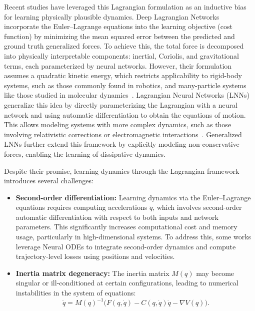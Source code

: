 \documentclass{article}
\theoremstyle{plain}
\theoremstyle{definition}
\theoremstyle{remark}
\begin{document}
Recent studies have leveraged this Lagrangian formulation as an inductive bias for learning physically plausible dynamics.  Deep Lagrangian Networks \cite{deepleangragiaannetworks} incorporate the Euler--Lagrange equations into the learning objective (cost function) by minimizing the mean squared error between the predicted and ground truth generalized forces. To achieve this, the total force is decomposed into physically interpretable components: inertial, Coriolis, and gravitational terms, each parameterized by neural networks. However, their formulation assumes a quadratic kinetic energy, which restricts applicability to rigid-body systems, such as those commonly found in robotics, and many-particle systems like those studied in molecular dynamics~\cite{robotics_systems, molecular_dynamics}. Lagrangian Neural Networks (LNNs) \cite{lnns} generalize this idea by directly parameterizing the Lagrangian with a neural network and using automatic differentiation to obtain the equations of motion. This allows modeling systems with more complex dynamics, such as those involving relativistic corrections or electromagnetic interactions~\cite{lnns}. Generalized LNNs \cite{xiao2024generalizedlagrangianneuralnetworks} further extend this framework by explicitly modeling non-conservative forces, enabling the learning of dissipative dynamics.

Despite their promise, learning dynamics through the Lagrangian framework introduces several challenges:
\begin{itemize}
    \item \textbf{Second-order differentiation:} Learning dynamics via the Euler--Lagrange equations requires computing accelerations $\ddot{q}$, which involves second-order automatic differentiation with respect to both inputs and network parameters. This significantly increases computational cost and memory usage, particularly in high-dimensional systems. To address this, some works leverage Neural ODEs \cite{chen2019neuralordinarydifferentialequations, zhong2024symplecticodenetlearninghamiltonian} to integrate second-order dynamics and compute trajectory-level losses using positions and velocities.
    \item \textbf{Inertia matrix degeneracy:} The inertia matrix $M(q)$ may become singular or ill-conditioned at certain configurations, leading to numerical instabilities in the system of equations:
\[
\ddot{q} = M(q)^{-1} \bigl( F(q, \dot{q}) - C(q, \dot{q}) \dot{q} - \nabla V(q) \bigr).
\]
\end{itemize}
\end{document}
